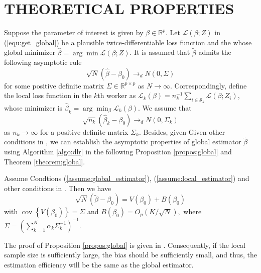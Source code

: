 \documentclass[11pt,en,authoryear]{elegantpaper}
\numberwithin{equation}{section}
\newcommand{\mbR}{\mathbb{R}}
\begin{document}
\section{THEORETICAL PROPERTIES}\label{sec:3}

Suppose the parameter of interest is given by $\beta \in \mbR^{p}$. Let $\mathcal{L}(\beta ; Z)$ in (\ref{equ:get_global}) be a plausible twice-differentiable loss function and the whose global minimizer $\widehat{\beta} = \arg \min \mathcal{L}(\beta; Z)$. It is assumed that $\tilde{\beta}$ admits the following asymptotic rule
\begin{equation}\label{assume:global_estimator}
\sqrt{N}\left(\widehat{\beta}-\beta_{0}\right) \rightarrow_{d} N(0, \Sigma)
\end{equation}
for some positive definite matrix $\Sigma \in \mathbb{R}^{p \times p}$ as $N \rightarrow \infty$. Correspondingly, define the
local loss function in the $k$th worker as $\mathcal{L}_{k}(\beta)=n_{k}^{-1} \sum_{i \in \mathcal{S}_{k}} \mathcal{L}\left(\beta ; Z_{i}\right)$, whose minimizer is $\widehat{\beta}_{k}=\arg \min _{\beta} \mathcal{L}_{k}(\beta)$. We assume that
\begin{equation}\label{assume:local_estimator}
\sqrt{n_{k}}\left(\widehat{\beta}_{k}-\beta_{0}\right) \rightarrow_{d} N\left(0, \Sigma_{k}\right)
\end{equation}
as $n_{k} \rightarrow \infty$ for a positive definite matrix $\Sigma_{k}$. Besides, given Given other conditions in \cite{zhu2019least}, we can establish the asymptotic properties of global estimator $\tilde{\beta}$ using Algorithm \ref{algo:dlr} in the following Proposition \ref{propos:global} and Theorem \ref{theorem:global}.

\begin{proposition}\label{propos:global}
Assume Condtions (\ref{assume:global_estimator}), (\ref{assume:local_estimator}) and other conditions in \cite{zhu2019least}. Then we have
\begin{equation}
\sqrt{N}\left(\tilde{\beta}-\beta_{0}\right)=V\left(\beta_{0}\right)+B\left(\beta_{0}\right)
\end{equation}
with $\operatorname{cov}\left\{V\left(\beta_{0}\right)\right\}=\Sigma$ and $B\left(\beta_{0}\right)=O_{p}(K / \sqrt{N}),$ where $\Sigma=\left(\sum_{k=1}^{K} \alpha_{k} \Sigma_{k}^{-1}\right)^{-1} .$
\end{proposition}
The proof of Proposition \ref{propos:global} is given in \cite{zhu2019least}. Consequently, if the local sample size is sufficiently large, the bias should be sufficiently small, and thus, the estimation efficiency will be the same as the global estimator.
\end{document}
